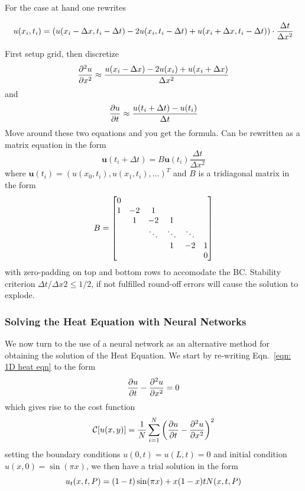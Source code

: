 \documentclass[reprint, english, nofootinbib]{revtex4-2}
\begin{document}
For the case at hand one rewrites 
\begin{widetext}
\begin{equation}
    u(x_i,t_i) = \qty(u(x_i - \Delta x,t_i - \Delta t) - 
                 2u(x_i,t_i-\Delta t) + 
                 u(x_i+\Delta x,t_i-\Delta t)) \cdot \frac{\Delta t}{\Delta x^2} 
\end{equation}
\end{widetext}
First setup grid, then discretize 
\begin{equation}
   \pdv[2]{u}{x} \approx \frac{u(x_i-\Delta x)-2u(x_i) + u(x_i+\Delta x)}{\Delta x^2} 
\end{equation}
and
\begin{equation}
    \pdv{u}{t} \approx \frac{u(t_i + \Delta t) - u(t_{i})}{\Delta t}
\end{equation}
Move around these two equations and you get the formula. Can be rewritten as a matrix equation in the form
\begin{equation}
    \pmb u(t_i+\Delta t) = B \pmb u(t_i) \frac{\Delta t}{\Delta x^2}
\end{equation}
where $\pmb u(t_i) = (u(x_0, t_i), u(x_1, t_i), \dots)^T$ and $B$ is a tridiagonal matrix in the form
\begin{equation} \label{eqn: Az = b}
    B = \qty[
    \begin{matrix}
    0 \\
    1 & -2 & 1 \\
    & 1 & -2 & 1 \\
    && \ddots & \ddots & \ddots \\
    &&& 1 & -2 & 1 \\
    &&&&& 0
    \end{matrix}
    ]
 \end{equation}
with zero-padding on top and bottom rows to accomodate the BC. Stability criterion $\Delta t/\Delta x2 \leq 1/2$, if not fulfilled round-off errors will cause the solution to explode. 

\subsubsection{Solving the Heat Equation with Neural Networks}
\noindent
We now turn to the use of a neural network as an alternative method for obtaining the solution of the Heat Equation. We start by re-writing Eqn.~\ref{eqn: 1D heat eqn} to the form
\begin{equation}
    \pdv{u}{t} - \pdv[2]{u}{x} = 0
\end{equation}
which gives rise to the cost function 
\begin{equation}
    \mathcal C\qty[u\qty(x, y)] = \frac{1}{N}\sum_{i=1}^N \qty(\pdv{u}{t} - \pdv[2]{u}{x})^2
\end{equation}
setting the boundary conditions $u(0, t) = u(L, t) = 0$ and initial condition $u(x, 0) = \sin(\pi x)$, we then have a trial solution in the form
\begin{equation}
    u_t(x, t, P) = \qty(1 - t)\sin(\pi x) + x(1 - x)t N(x, t, P)
\end{equation}
\end{document}
